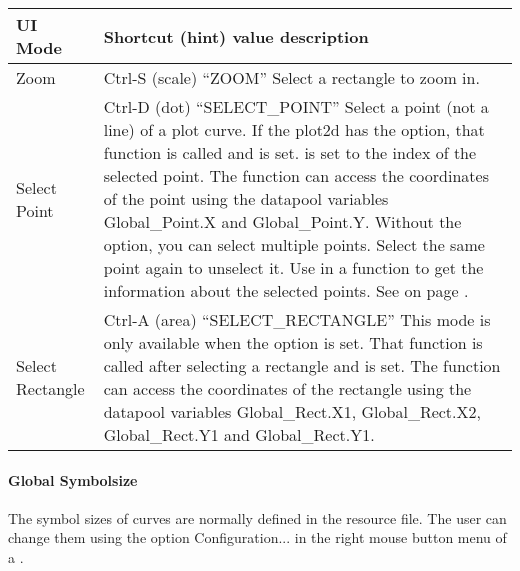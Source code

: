 \begin{tabularx}{\textwidth}{p{4cm}|X}
UI Mode           & Shortcut (hint) \PLOTTWODUIMODE{} value \newline
                    description \\
\hline
Zoom              &  Ctrl-S (scale) ``ZOOM'' \newline
                     Select a rectangle to zoom in. \\
Select Point      & Ctrl-D (dot) ``SELECT\_POINT'' \newline
                    Select a point (not a line) of a plot curve. \newline
                    If the plot2d has the \FUNC{} option, that function is called
                    and \REASONSELECTPOINT{} is set. \INDEX{} is set to the index
                    of the selected point.
                    The function can access the coordinates of the point using the datapool variables
                    Global\_Point.X and Global\_Point.Y. \newline
                    Without the \FUNC{} option, you can select multiple points.
                    Select the same point again to unselect it. Use \GETSELECTION{} in a function
                    to get the information about the selected points.
                    See \nameref{dia:guimorestatement} on page \pageref{dia:guimorestatement}. \\
Select Rectangle  & Ctrl-A (area) ``SELECT\_RECTANGLE'' \newline
                    This mode is only available when the \FUNC{} option is set.
                    That function is called after selecting a rectangle and \REASONSELECTRECTANGLE{} is set.
                    The function can access the coordinates of the rectangle using the datapool variables
                    Global\_Rect.X1,  Global\_Rect.X2, Global\_Rect.Y1 and Global\_Rect.Y1. \\
\end{tabularx}
\vspace{0.5cm}

\paragraph{Global Symbolsize}
\label{par:uiplot2symbolsize}
The symbol sizes of \PLOTTWOD{} curves are normally defined in the resource file.
The user can change them using the option Configuration... in the right mouse button menu of a \PLOTTWOD.

